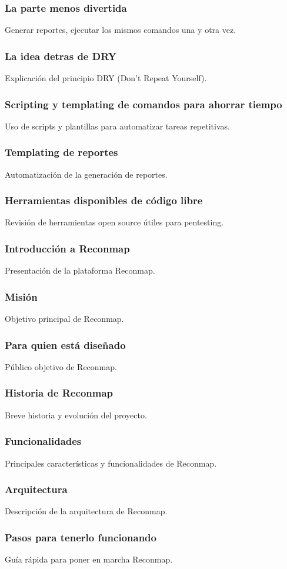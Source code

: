 \documentclass{beamer}
\begin{document}
\begin{frame}
	\frametitle{La parte menos divertida}
	Generar reportes, ejecutar los mismos comandos una y otra vez.
\end{frame}

\begin{frame}
	\frametitle{La idea detras de DRY}
	Explicación del principio DRY (Don't Repeat Yourself).
\end{frame}

\begin{frame}
	\frametitle{Scripting y templating de comandos para ahorrar tiempo}
	Uso de scripts y plantillas para automatizar tareas repetitivas.
\end{frame}

\begin{frame}
	\frametitle{Templating de reportes}
	Automatización de la generación de reportes.
\end{frame}

\begin{frame}
	\frametitle{Herramientas disponibles de código libre}
	Revisión de herramientas open source útiles para pentesting.
\end{frame}

\begin{frame}
	\frametitle{Introducción a Reconmap}
	Presentación de la plataforma Reconmap.
\end{frame}

\begin{frame}
	\frametitle{Misión}
	Objetivo principal de Reconmap.
\end{frame}

\begin{frame}
	\frametitle{Para quien está diseñado}
	Público objetivo de Reconmap.
\end{frame}

\begin{frame}
	\frametitle{Historia de Reconmap}
	Breve historia y evolución del proyecto.
\end{frame}

\begin{frame}
	\frametitle{Funcionalidades}
	Principales características y funcionalidades de Reconmap.
\end{frame}

\begin{frame}
	\frametitle{Arquitectura}
	Descripción de la arquitectura de Reconmap.
\end{frame}

\begin{frame}
	\frametitle{Pasos para tenerlo funcionando}
	Guía rápida para poner en marcha Reconmap.
\end{frame}
\end{document}
